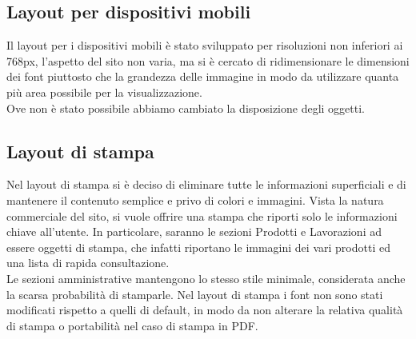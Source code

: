 \documentclass[11pt]{article}
\begin{document}
\subsection{Layout per dispositivi mobili}
Il layout per i dispositivi mobili è stato sviluppato per risoluzioni non inferiori ai 768px, l'aspetto del sito non varia, ma si è cercato di ridimensionare le dimensioni dei font piuttosto che la grandezza delle immagine in modo da utilizzare quanta più area possibile per la visualizzazione.
\\Ove non è stato possibile abbiamo cambiato la disposizione degli oggetti.

\subsection{Layout di stampa}
Nel layout di stampa si è deciso di eliminare tutte le informazioni superficiali e di mantenere il contenuto semplice e privo di colori e immagini. Vista la natura commerciale del sito, si vuole offrire una stampa che riporti solo le informazioni chiave all'utente. In particolare, saranno le sezioni Prodotti e Lavorazioni ad essere oggetti di stampa, che infatti riportano le immagini dei vari prodotti ed una lista di rapida consultazione. 
\\Le sezioni amministrative mantengono lo stesso stile minimale, considerata anche la scarsa probabilità di stamparle. Nel layout di stampa i font non sono stati modificati rispetto a quelli di default, in modo da non alterare la relativa qualità di stampa o portabilità nel caso di stampa in PDF.
\newpage
\end{document}
